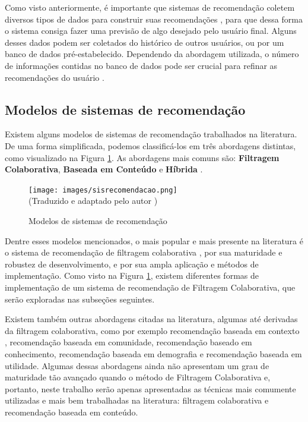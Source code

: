 \documentclass[
	12pt,				%
	oneside,			%
	a4paper,			%
	chapter=TITLE,		%
	english,			%
	french,				%
	spanish,			%
	brazil				%
	]{abntex2}
\begin{document}
Como visto anteriormente, é importante que sistemas de recomendação coletem diversos tipos de dados para construir suas recomendações \cite{ricci2011introduction, herlocker2004evaluating}, para que dessa forma o sistema consiga fazer uma previsão de algo desejado pelo usuário final. Alguns desses dados podem ser coletados do histórico de outros usuários, ou por um banco de dados pré-estabelecido. Dependendo da abordagem utilizada, o número de informações contidas no banco de dados pode ser crucial para refinar as recomendações do usuário \cite{resnick1997recommender}.

\subsection{Modelos de sistemas de recomendação}

Existem alguns modelos de sistemas de recomendação trabalhados na literatura. De uma forma simplificada, podemos classificá-los em três abordagens distintas, como visualizado na Figura \ref{fig:sisrec}. As abordagens mais comuns são: \textbf{Filtragem Colaborativa}, \textbf{Baseada em Conteúdo} e \textbf{Híbrida} \cite{ricci2011introduction}.

\begin{figure}[H]
    \centering
    \caption{Modelos de sistemas de recomendação}
    \texttt{[image: images/sisrecomendacao.png]}
    \label{fig:sisrec}
    \\
    \textual (Traduzido e adaptado pelo autor \cite{wikimedia1})
\end{figure}

Dentre esses modelos mencionados, o mais popular e mais presente na literatura é o sistema de recomendação de filtragem colaborativa \cite{ricci2011introduction, isinkaye2015recommendation, good1999combining}, por sua maturidade e robustez de desenvolvimento, e por sua ampla aplicação e métodos de implementação. Como visto na Figura \ref{fig:sisrec}, existem diferentes formas de implementação de um sistema de recomendação de Filtragem Colaborativa, que serão exploradas nas subseções seguintes.  

Existem também outras abordagens citadas na literatura, algumas até derivadas da filtragem colaborativa, como por exemplo recomendação baseada em contexto \cite{adomavicius2011context}, recomendação baseada em comunidade, recomendação baseado em conhecimento, recomendação baseada em demografia e recomendação baseada em utilidade\cite[p. 13]{ricci2011introduction}. Algumas dessas abordagens ainda não apresentam um grau de maturidade tão avançado quando o método de Filtragem Colaborativa e, portanto, neste trabalho serão apenas apresentadas as técnicas mais comumente utilizadas e mais bem trabalhadas na literatura: filtragem colaborativa e recomendação baseada em conteúdo.
\end{document}
